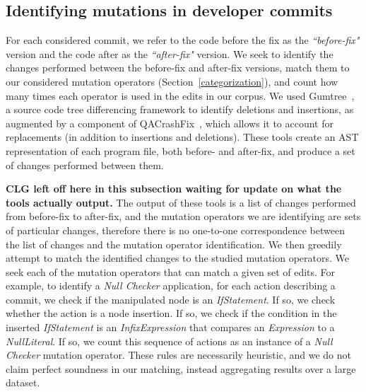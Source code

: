 \documentclass[conference]{IEEEtran}
\newcommand{\todo}[1]
  {{\scriptsize \textbf{\color{red} {#1}}}}
\begin{document}
\subsection{Identifying mutations in developer commits}
\label{sec:mining}

For each considered commit, we refer to the code before the fix as the
\emph{``before-fix"} version and the code after as the \emph{``after-fix"} version.
We seek to identify the changes performed between the before-fix and
after-fix versions, match them to our considered mutation operators
(Section~\ref{categorization}), and count how many times each operator is used
in the edits in our corpus. 
We used Gumtree~\cite{falleri14}, a source code tree
differencing framework to identify deletions and insertions, as augmented by a
component of QACrashFix~\cite{gao15}, which allows it to account for
replacements (in addition to insertions and deletions).
These tools create an AST representation of each program file, both before- and after-fix, and produce a set of 
changes performed between them. 

\todo{CLG left off here in this subsection waiting for update on what the tools
  actually output.}
The output of these tools is a list of changes performed from before-fix to after-fix, and the mutation operators we are identifying are sets of particular changes, therefore there is no one-to-one correspondence between the list of changes and the mutation operator identification. We then greedily attempt to match the identified changes to the
studied
mutation operators. We seek each of the mutation operators that can match a given set
of edits.  For example, to identify
a \emph{Null Checker} application, for each action describing a commit, we check
if the manipulated node
is an \emph{IfStatement}.  If so, we check whether the action
is a node insertion.  If so, we check if the condition in the inserted
\emph{IfStatement} is an 
\emph{InfixExpression} that compares an 
\emph{Expression} to a
\emph{NullLiteral}. If so, we count this sequence of
actions as an instance of a \emph{Null Checker} mutation operator.  These rules are
necessarily heuristic, and we do not claim perfect soundness in our matching,
instead aggregating results over a large dataset.  
\end{document}
